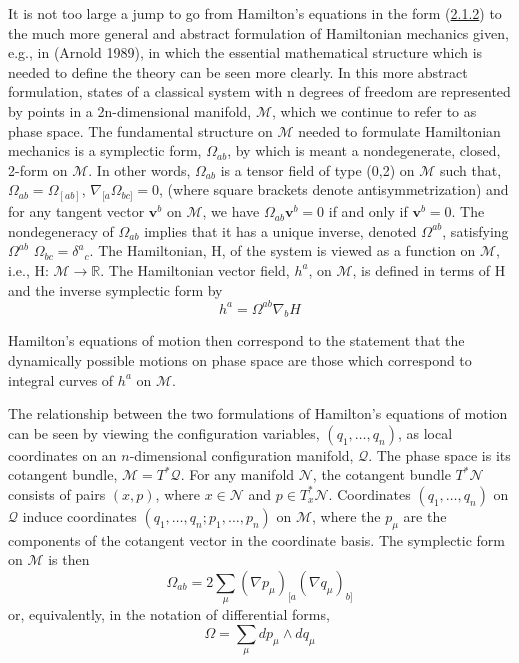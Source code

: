 \documentclass[11pt,a4paper]{article}
\begin{document}
It is not too large a jump to go from Hamilton's equations in the form (\hyperref[eq:2.1.2]{2.1.2}) to the much more general and abstract formulation of Hamiltonian mechanics given, e.g., in (Arnold 1989), in which the essential mathematical structure which is needed to define the theory can be seen more clearly. In this more abstract formulation, states of a classical system with n degrees of freedom are represented by points in a 2n-dimensional manifold, \(\mathcal{M}\), which we continue to refer to as phase space. The fundamental structure on \(\mathcal{M}\) needed to formulate Hamiltonian mechanics is a symplectic form, \(\Omega_{ab}\), by which is meant a nondegenerate, closed, 2-form on \(\mathcal{M}\). In other words, \(\Omega_{ab}\) is a tensor field of type (0,2) on \(\mathcal{M}\) such that, \(\Omega_{ab} = \Omega_{[ab]}\), \(\nabla_{[a}\Omega_{bc]} = 0\), (where square brackets denote antisymmetrization) and for any tangent vector \(\mathbf{v}^b\) on \(\mathcal{M}\), we have \(\Omega_{ab}\mathbf{v}^b = 0\) if and only if \(\mathbf{v}^b = 0\). The nondegeneracy of \(\Omega_{ab}\) implies that it has a unique inverse, \hypertarget{source-25}{} denoted \(\Omega^{ab}\), satisfying \(\Omega^{ab}\) \(\Omega_{bc}=\delta^a{}_c\). The Hamiltonian, H, of the system is viewed as a function on \(\mathcal{M}\), i.e., H: \(\mathcal{M}\to\mathbb{R}\). The Hamiltonian vector field, \(h^a\), on \(\mathcal{M}\), is defined in terms of H and the inverse symplectic form by
\begin{equation*}
h^{a} = \Omega^{ab} \nabla_{b} H \tag{2.1.3}\label{eq:2.1.3}
\end{equation*}

Hamilton's equations of motion then correspond to the statement that the dynamically possible motions on phase space are those which correspond to integral curves of \(h^a\) on \(\mathcal{M}\).

The relationship between the two formulations of Hamilton's equations of motion can be seen by viewing the configuration variables, \((q_1,\ldots,q_n)\), as local coordinates on an \(n\)-dimensional configuration manifold, \(\mathcal{Q}\). The phase space is its cotangent bundle, \(\mathcal{M}=T^*\mathcal{Q}\). For any manifold \(\mathcal{N}\), the cotangent bundle \(T^*\mathcal{N}\) consists of pairs \((x,p)\), where \(x\in\mathcal{N}\) and \(p\in T_x^*\mathcal{N}\). Coordinates \((q_1,\ldots,q_n)\) on \(\mathcal{Q}\) induce coordinates \((q_1,\ldots,q_n;p_1,\ldots,p_n)\) on \(\mathcal{M}\), where the \(p_\mu\) are the components of the cotangent vector in the coordinate basis. The symplectic form on \(\mathcal{M}\) is then
\begin{equation*}
\Omega_{ab} = 2 \sum_{\mu} (\nabla p_{\mu})_{[a} (\nabla q_{\mu})_{b]} \tag{2.1.4}\label{eq:2.1.4}
\end{equation*}
or, equivalently, in the notation of differential forms,
\begin{equation*}
\Omega = \sum_{\mu} dp_{\mu} \wedge dq_{\mu} \tag{2.1.5}\label{eq:2.1.5}
\end{equation*}
\end{document}
